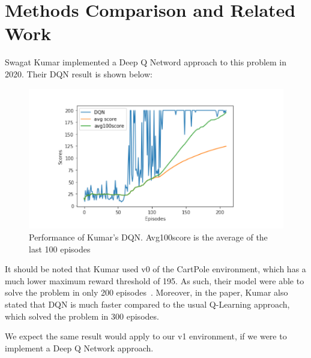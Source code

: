 \section{Methods Comparison and Related Work}

Swagat Kumar implemented a Deep Q Netword approach to this problem in 2020.
Their DQN result is shown below:

\begin{figure}[H] %
    \centering
    \includegraphics[width=0.75\linewidth]{kumar-2020-dqn.png}
    \caption{Performance of Kumar's DQN. Avg100score is the average of the last 100 episodes}
\end{figure}

It should be noted that Kumar used v0 of the CartPole environment, which has a much lower maximum reward threshold of 195. As such,
their model were able to solve the problem in only 200 episodes~\citep{kumar2020balancing}. Moreover, in the paper, Kumar also stated that
DQN is much faster compared to the usual Q-Learning approach, which solved the problem in 300 episodes.

We expect the same result would apply to our v1 environment, if we were to implement a Deep Q Network approach.
